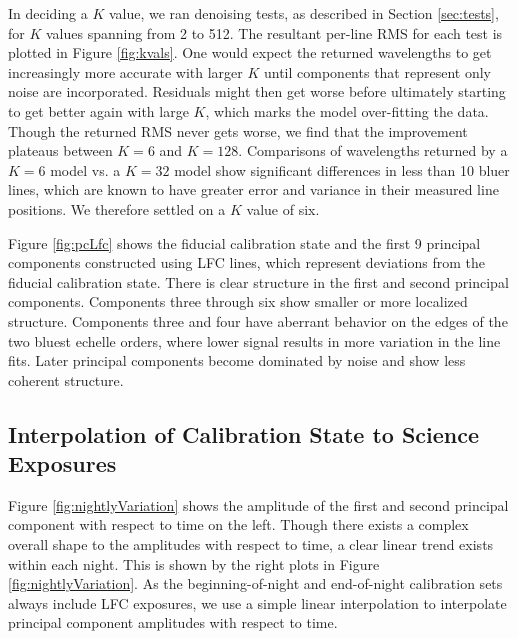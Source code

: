 \documentclass[modern]{aastex63}
\begin{document}
In deciding a $K$ value, we ran denoising tests, as described in Section \ref{sec:tests}, for $K$ values spanning from 2 to 512.  The resultant per-line RMS for each test is plotted in Figure \ref{fig:kvals}.  One would expect the returned wavelengths to get increasingly more accurate with larger $K$ until components that represent only noise are incorporated.  Residuals might then get worse before ultimately starting to get better again with large $K$, which marks the model over-fitting the data.  Though the returned RMS never gets worse, we find that the improvement plateaus between $K=6$ and $K=128$.  Comparisons of wavelengths returned by a $K=6$ model vs. a $K=32$ model show significant differences in less than 10 bluer lines, which are known to have greater error and variance in their measured line positions.  We therefore settled on a $K$ value of six.

Figure \ref{fig:pcLfc} shows the fiducial calibration state and the first 9 principal components constructed using LFC lines, which represent deviations from the fiducial calibration state.  There is clear structure in the first and second principal components.  Components three through six show smaller or more localized structure.  Components three and four have aberrant behavior on the edges of the two bluest echelle orders, where lower signal results in more variation in the line fits.  Later principal components become dominated by noise and show less coherent structure.

\subsection{Interpolation of Calibration State to Science Exposures}
\label{sec:choice_avt}
Figure \ref{fig:nightlyVariation} shows the amplitude of the first and second principal component with respect to time on the left.  Though there exists a complex overall shape to the amplitudes with respect to time, a clear linear trend exists within each night.  This is shown by the right plots in Figure  \ref{fig:nightlyVariation}.  As the beginning-of-night and end-of-night calibration sets always include LFC exposures, we use a simple linear interpolation to interpolate principal component amplitudes with respect to time.
\end{document}
